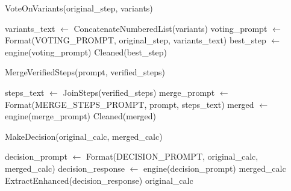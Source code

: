 \documentclass{article}
\begin{document}
\begin{algorithm}
\caption{VoteOnVariants(original\_step, variants)}
\begin{algorithmic}[1]
\State variants\_text $\gets$ ConcatenateNumberedList(variants)
\State voting\_prompt $\gets$ Format(VOTING\_PROMPT, original\_step, variants\_text)
\State best\_step $\gets$ engine(voting\_prompt)
\State \Return Cleaned(best\_step)
\end{algorithmic}
\end{algorithm}

\begin{algorithm}
\caption{MergeVerifiedSteps(prompt, verified\_steps)}
\begin{algorithmic}[1]
\State steps\_text $\gets$ JoinSteps(verified\_steps)
\State merge\_prompt $\gets$ Format(MERGE\_STEPS\_PROMPT, prompt, steps\_text)
\State merged $\gets$ engine(merge\_prompt)
\State \Return Cleaned(merged)
\end{algorithmic}
\end{algorithm}

\begin{algorithm}
\caption{MakeDecision(original\_calc, merged\_calc)}
\begin{algorithmic}[1]
\State decision\_prompt $\gets$ Format(DECISION\_PROMPT, original\_calc, merged\_calc)
\State decision\_response $\gets$ engine(decision\_prompt)
    \State \Return merged\_calc
    \State \Return ExtractEnhanced(decision\_response)
\Else
    \State \Return original\_calc
\EndIf
\end{algorithmic}
\end{algorithm}
\end{document}
